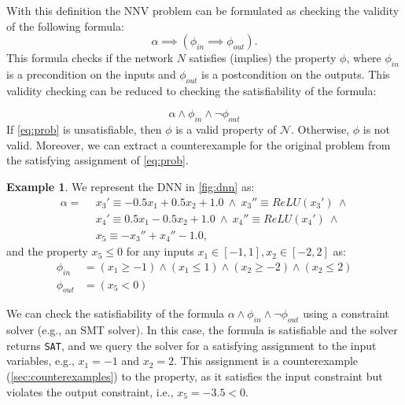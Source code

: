 \documentclass[oneside,11pt,dvipsnames]{book}
\numberwithin{equation}{section}
\theoremstyle{definition}
\newtheorem{example}{Example}[section]
\theoremstyle{remark}
\newcommand{\sat}{\texttt{SAT}}
\begin{document}
With this definition the NNV problem can be formulated as checking the validity of the following formula:
\begin{equation}\label{eq:nnv}
    \alpha \implies (\phi_{in} \implies \phi_{out}).
\end{equation}
This formula checks if the network $N$ satisfies (implies) the property $\phi$, where $\phi_{in}$ is a precondition on the inputs and $\phi_{out}$ is a postcondition on the outputs. This validity checking can be reduced to checking the satisfiability of the formula:

\begin{equation}\label{eq:prob}
  \alpha \land \phi_{in} \land \neg \phi_{out}
\end{equation}
If \autoref{eq:prob} is unsatisfiable, then $\phi$ is a valid property of $\mathcal{N}$. Otherwise, $\phi$ is not valid.  Moreover, we can extract a counterexample for the original problem from the satisfying assignment of \autoref{eq:prob}.

\begin{example}\label{ex:dnn-sat}
We represent the DNN in \autoref{fig:dnn} as:
\begin{align*}
\alpha = ~~& x_3' \equiv -0.5x_1 + 0.5x_2 + 1.0 ~\land~ x_3'' \equiv ReLU(x_3') ~\land \\
         ~~& x_4' \equiv 0.5x_1 - 0.5x_2 + 1.0  ~\land~ x_4'' \equiv ReLU(x_4') ~\land \\
         ~~& x_5 \equiv -x_3'' + x_4'' - 1.0,
\end{align*}
\noindent and the property $x_5 \le 0$ for any inputs $x_1 \in [-1,1], x_2\in[-2,2]$ as:
\begin{align*}
\phi_{in} &= (x_1 \ge -1) \land (x_1 \le 1) \land (x_2 \ge -2) \land (x_2 \le 2)\\
\phi_{out} &= (x_5 < 0)
\end{align*}

We can check the satisfiability of the formula $\alpha \land \phi_{in} \land \neg \phi_{out}$ using a constraint solver (e.g., an SMT solver).  In this case, the formula is satisfiable and the solver returns \sat{}, and we query the solver for a satisfying assignment to the input variables, e.g., $x_1=-1$ and $x_2=2$. This assignment is a counterexample (\autoref{sec:counterexamples}) to the property, as it satisfies the input constraint but violates the output constraint, i.e., $x_5 = -3.5 < 0$.

\end{example}
\end{document}
